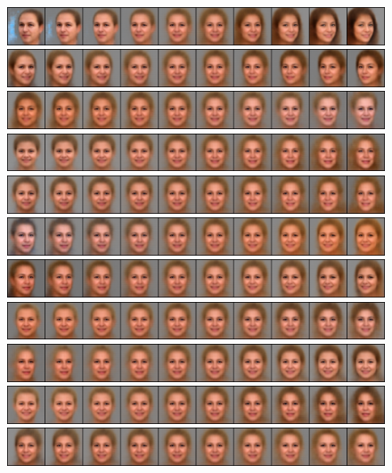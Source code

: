 \documentclass{article}
\begin{document}
\begin{figure}[H]
  \centering
  \includegraphics[width=0.9\linewidth]{eigen/grey_vae_0.png}
  \includegraphics[width=0.9\linewidth]{eigen/grey_vae_1.png}
  \includegraphics[width=0.9\linewidth]{eigen/grey_vae_2.png}
  \includegraphics[width=0.9\linewidth]{eigen/grey_vae_3.png}
  \includegraphics[width=0.9\linewidth]{eigen/grey_vae_4.png}
  \includegraphics[width=0.9\linewidth]{eigen/grey_vae_5.png}
  \includegraphics[width=0.9\linewidth]{eigen/grey_vae_6.png}
  \includegraphics[width=0.9\linewidth]{eigen/grey_vae_7.png}
  \includegraphics[width=0.9\linewidth]{eigen/grey_vae_8.png}
  \includegraphics[width=0.9\linewidth]{eigen/grey_vae_9.png}
  \includegraphics[width=0.9\linewidth]{eigen/grey_vae_10.png}

\end{figure}
\end{document}
